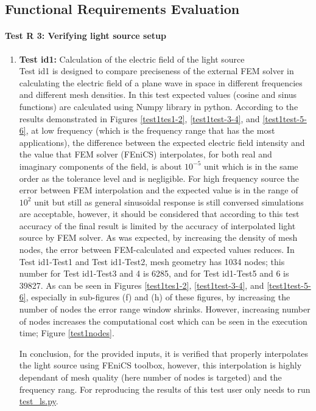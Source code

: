 \documentclass[12pt, titlepage]{article}
\begin{document}
\subsection{Functional Requirements Evaluation}

\paragraph{Test R 3: Verifying light source setup}

\begin{enumerate}
	\item{\textbf{Test id1:}  Calculation of the electric field of the light source\\}
	 Test id1 is designed to compare preciseness of the external FEM solver in calculating the electric field of a plane wave in space in different frequencies and different mesh densities. In this test expected values (cosine and sinus functions) are calculated using Numpy library in python. According to the results demonstrated in Figures \ref{test1tes1-2}, \ref{test1test-3-4}, and \ref{test1test-5-6}, at low frequency (which is the frequency range that has the most applications), the difference between the expected electric field intensity and the value that FEM solver (FEniCS) interpolates, for both real and imaginary components of the field, is about $10^{-5}$ unit which is in the same order as the tolerance level and is negligible. For high frequency source the error between FEM interpolation and the expected value is in the range of $10^2$ unit but still as general sinusoidal response is still conversed simulations are acceptable, however, it should be considered that according to this test accuracy of the final result is limited by the accuracy of interpolated light source by FEM solver. 
	 As was expected, by increasing the density of mesh nodes, the error between FEM-calculated and expected values reduces. In Test id1-Test1 and Test id1-Test2, mesh geometry has 1034 nodes; this number for Test id1-Test3 and 4 is 6285, and for  Test id1-Test5 and 6 is 39827. As can be seen in Figures \ref{test1tes1-2}, \ref{test1test-3-4}, and \ref{test1test-5-6}, especially in sub-figures (f) and (h) of these figures, by increasing the number of nodes the error range window shrinks. However, increasing number of nodes increases the computational cost which can be seen in the execution time; Figure \ref{test1nodes}.
	
	 In conclusion, for the provided inputs, it is verified that \progname{} properly interpolates the light source using FEniCS toolbox, however, this interpolation is highly dependant of mesh quality (here number of nodes is targeted) and the frequency rang. For reproducing the results of this test user only needs to run \href{https://github.com/shmouses/SPDFM/tree/master/src/test_ls.py}{test\_ls.py}.  
	 

\end{enumerate}
\end{document}
